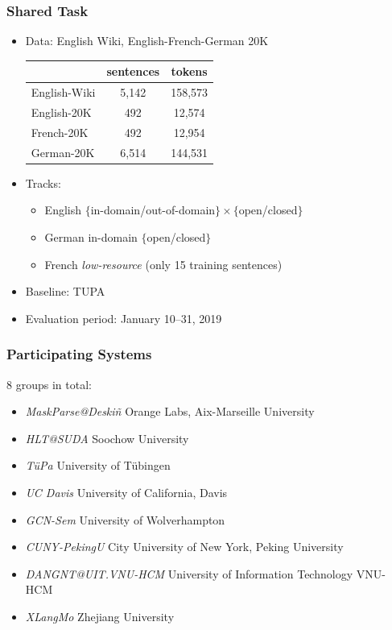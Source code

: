 \documentclass[t,xcolor={svgnames,table}]{beamer}
\begin{document}
\begin{frame}
\frametitle{Shared Task}
\Large
\begin{itemize}
\item Data: English Wiki, English-French-German 20K
     \begin{center}
      \begin{tabular}{lcc}
      & sentences & tokens \\
          \hline
          English-Wiki & 5,142      & 158,573 \\
          English-20K  & 492       & 12,574  \\
          French-20K   & 492       & 12,954  \\
          German-20K   & 6,514      & 144,531
      \end{tabular}
      \end{center}
\item Tracks:
        \begin{itemize}
            \item 
                English $\{$in-domain/out-of-domain$\} \times 
                \{$open/closed$\}$
            \item
                German in-domain $\{$open/closed$\}$
            \item
                French \textit{low-resource} (only 15 training sentences)
        \end{itemize}
\item Baseline: TUPA
\item Evaluation period: January 10--31, 2019
\end{itemize}
\end{frame}

\begin{frame}
\frametitle{Participating Systems}
 8 groups in total:
 \begin{itemize}
 \item
 {\it ​MaskParse@Deski\~{n}}  {\small Orange Labs, Aix-Marseille University}
 \item
 {\it HLT@SUDA} { \small  Soochow University}
 \item
 {\it T\"{u}Pa} {\small   University of T\"{u}bingen}
 \item
 {\it UC Davis} {\small   University of California, Davis}
 \item    
 {\it GCN-Sem}  {\small   University of Wolverhampton}
 \item
    {\it CUNY-PekingU} {\small 	 City University of New York, Peking University}
 \item
{\it DANGNT@UIT.VNU-HCM} {\small   University of Information Technology VNU-HCM}
 \item
{\it XLangMo} {\small  Zhejiang University}
\end{itemize}

\end{frame}
\end{document}
